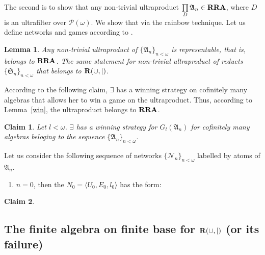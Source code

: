 \documentclass[a4paper]{article}
\theoremstyle{defin}
\theoremstyle{theorem}
\theoremstyle{prop}
\theoremstyle{lemma}
\newtheorem{lemma}{Lemma}
\theoremstyle{ex}
\theoremstyle{col}
\theoremstyle{claim}
\newtheorem{claim}{Claim}
\begin{document}
The second is to show that any non-trivial ultraproduct $\prod \limits_{D} \mathfrak{A}_n \in {\bf RRA}$, where $D$ is an ultrafilter over $\mathcal{P}(\omega)$. We show that via the rainbow technique. Let us define networks and games according to \cite{hirsch1997step}.

\begin{lemma}
  Any non-trivial ultraproduct of $\{ \mathfrak{A}_n \}_{n < \omega}$ is representable, that is, belongs to ${\bf RRA}$. The same statement for non-trivial ultraproduct of reducts $\{ \mathfrak{S}_n \}_{n < \omega}$ that belongs to ${\bf R}(\cup, |)$.
\end{lemma}

According to the following claim, $\exists$ has a winning strategy on cofinitely many algebras that allows her to win a game on the ultraproduct. Thus, according to Lemma~\ref{win}, the ultraproduct belongs to ${\bf RRA}$.

\begin{claim}
  Let $l < \omega$. $\exists$ has a winning strategy for $G_l(\mathfrak{A}_n)$ for cofinitely many algebras beloging to the sequence $\{ \mathfrak{A}_n \}_{n < \omega}$.
\end{claim}

Let us consider the following sequence of networks $\{ \mathcal{N}_n \}_{n < \omega}$ labelled by atoms of $\mathfrak{A}_n$.

\begin{enumerate}
  \item $n = 0$, then the $N_0 = \langle U_0, E_0, l_0 \rangle$ has the form:
\end{enumerate}


\begin{claim}
\end{claim}

\subsection{The finite algebra on finite base for ${\bf R}(\cup, |)$ (or its failure)}



\end{document}
